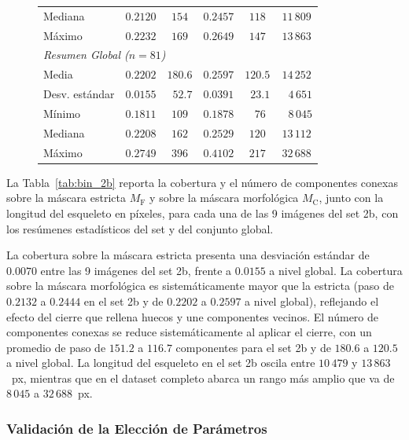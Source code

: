\begin{figure}[H]
\begin{minipage}[t]{0.7\textwidth}
\begin{tabular}{lccccc}
\quad Mediana         & $0.2120$ & $154$   & $0.2457$ & $118$              & $11\,809$ \\
\quad Máximo          & $0.2232$ & $169$   & $0.2649$ & $147$              & $13\,863$ \\
\midrule
\multicolumn{6}{l}{\textit{Resumen Global ($n=81$)}} \\
\quad Media           & $0.2202$ & $180.6$ & $0.2597$ & $120.5$ & $14\,252$ \\
\quad Desv. estándar  & $0.0155$ & $\phantom{0}52.7$  & $0.0391$ & $\phantom{0}23.1$  & $\phantom{0\,}4\,651$ \\
\quad Mínimo          & $0.1811$ & $109$   & $0.1878$ & $\phantom{0}76$    & $\phantom{0\,}8\,045$ \\
\quad Mediana         & $0.2208$ & $162$   & $0.2529$ & $120$              & $13\,112$ \\
\quad Máximo          & $0.2749$ & $396$   & $0.4102$ & $217$              & $32\,688$ \\
\bottomrule
\end{tabular}
\end{minipage}
\end{figure}
 
La Tabla~\ref{tab:bin_2b} reporta la cobertura y el número de componentes conexas sobre la máscara estricta $M_{\mathrm{F}}$ y sobre la máscara morfológica $M_{\mathrm{C}}$, junto con la longitud del esqueleto en píxeles, para cada una de las 9 imágenes del set 2b, con los resúmenes estadísticos del set y del conjunto global.
 
 
La cobertura sobre la máscara estricta presenta una desviación estándar de $0.0070$ entre las 9 imágenes del set 2b, frente a $0.0155$ a nivel global. La cobertura sobre la máscara morfológica es sistemáticamente mayor que la estricta (paso de $0.2132$ a $0.2444$ en el set 2b y de $0.2202$ a $0.2597$ a nivel global), reflejando el efecto del cierre que rellena huecos y une componentes vecinos. El número de componentes conexas se reduce sistemáticamente al aplicar el cierre, con un promedio de paso de $151.2$ a $116.7$ componentes para el set 2b y de $180.6$ a $120.5$ a nivel global. La longitud del esqueleto en el set 2b oscila entre $10\,479$ y $13\,863$~px, mientras que en el dataset completo abarca un rango más amplio que va de $8\,045$ a $32\,688$~px.
 

\subsubsection{Validación de la Elección de Parámetros}
 
